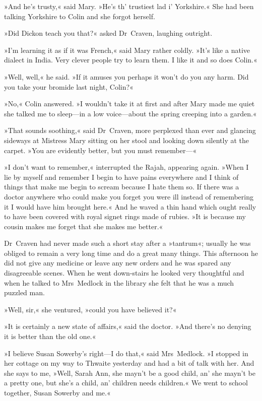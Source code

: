 »And he's trusty,« said Mary. »He's th' trustiest lad i' Yorkshire.« She had been talking Yorkshire to Colin and she forgot herself.

»Did Dickon teach you that?« asked Dr~Craven, laughing outright.

»I'm learning it as if it was French,« said Mary rather coldly. »It's like a native dialect in India. Very clever people try to learn them. I like it and so does Colin.«

»Well, well,« he said. »If it amuses you perhaps it won't do you any harm. Did you take your bromide last night, Colin?«

»No,« Colin answered. »I wouldn't take it at first and after Mary made me quiet she talked me to sleep—in a low voice—about the spring creeping into a garden.«

»That sounds soothing,« said Dr~Craven, more perplexed than ever and glancing sideways at Mistress Mary sitting on her stool and looking down silently at the carpet. »You are evidently better, but you must remember—«

»I don't want to remember,« interrupted the Rajah, appearing again. »When I lie by myself and remember I begin to have pains everywhere and I think of things that make me begin to scream because I hate them so. If there was a doctor anywhere who could make you forget you were ill instead of remembering it I would have him brought here.« And he waved a thin hand which ought really to have been covered with royal signet rings made of rubies. »It is because my cousin makes me forget that she makes me better.«

Dr~Craven had never made such a short stay after a »tantrum«; usually he was obliged to remain a very long time and do a great many things. This afternoon he did not give any medicine or leave any new orders and he was spared any disagreeable scenes. When he went down-stairs he looked very thoughtful and when he talked to Mrs~Medlock in the library she felt that he was a much puzzled man.

»Well, sir,« she ventured, »could you have believed it?«

»It is certainly a new state of affairs,« said the doctor. »And there's no denying it is better than the old one.«

»I believe Susan Sowerby's right—I do that,« said Mrs~Medlock. »I stopped in her cottage on my way to Thwaite yesterday and had a bit of talk with her. And she says to me, »Well, Sarah Ann, she mayn't be a good child, an' she mayn't be a pretty one, but she's a child, an' children needs children.« We went to school together, Susan Sowerby and me.«

